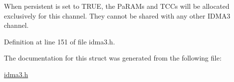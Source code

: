 When persistent is set to TRUE, the Pa\-RAMs and TCCs will be allocated exclusively for this channel. They cannot be shared with any other IDMA3 channel. 

Definition at line 151 of file idma3.h.

The documentation for this struct was generated from the following file:\begin{CompactItemize}
\item 
\hyperlink{idma3_8h}{idma3.h}\end{CompactItemize}

